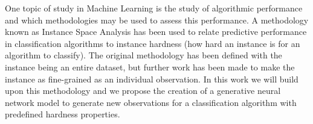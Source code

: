 One topic of study in Machine Learning is the study of algorithmic performance and which methodologies may be used to assess this performance. A methodology known as Instance Space Analysis has been used to relate predictive performance in classification algorithms to instance hardness (how hard an instance is for an algorithm to classify). The original methodology has been defined with the instance being an entire dataset, but further work has been made to make the instance as fine-grained as an individual observation. In this work we will build upon this methodology and we propose the creation of a generative neural network model to generate new observations for a classification algorithm with predefined hardness properties.
